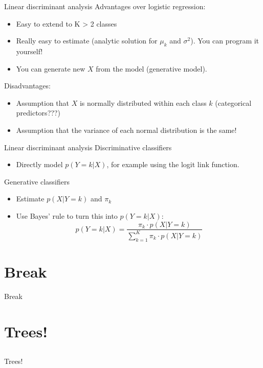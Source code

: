 \documentclass[xcolor=table,aspectratio=169]{beamer}
\begin{document}
\begin{frame}{Linear discriminant analysis}
	Advantages over logistic regression:
	\begin{itemize}
		\item Easy to extend to K > 2 classes
		\item Really easy to estimate (analytic solution for $\mu_k$ and $\sigma^2$). You can program it yourself!
		\item You can generate new $X$ from the model (generative model).
	\end{itemize}

	Disadvantages:
	\begin{itemize}
		\item Assumption that $X$ is normally distributed within each class $k$ (categorical predictors???)
		\item Assumption that the variance of each normal distribution is the same!
	\end{itemize}
\end{frame}

\begin{frame}{Linear discriminant analysis}
	Discriminative classifiers
	\begin{itemize}
		\item Directly model $p(Y = k | X)$, for example using the logit link function.
	\end{itemize}
	\vfill
	Generative classifiers
	\begin{itemize}
		\item Estimate $p(X | Y = k)$ and $\pi_k$
		\item Use Bayes' rule to turn this into $p(Y = k | X)$:
		$$p(Y = k | X) = \frac{\pi_k \cdot p(X | Y = k)}{\sum_{k = 1}^K \pi_k \cdot p(X | Y = k)}$$
	\end{itemize}
\end{frame}

\section{Break}
\begin{frame}
	Break
\end{frame}


\section{Trees!}
\subsection{}
\begin{frame}
	Trees!
\end{frame}
\end{document}
